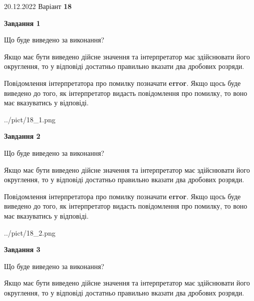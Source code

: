 \documentclass[12pt, ukrainian]{article}
\begin{document}
{20.12.2022 Варіант \No \textbf { 18 }\par}
{
\begin {Large}

{\begin {center}\textbf{Завдання 1}\end {center}}\par
Що буде виведено за виконання? \par

Якщо має бути виведено дійсне значення та інтерпретатор має здійснювати його округлення, 
то у відповіді достатньо правильно вказати два дробових розряди.

Повідомлення інтерпретатора про помилку позначати \textbf{error}.
Якщо щось буде виведено до того, як інтерпретатор видасть повідомлення про помилку, 
то воно має вказуватись у відповіді. \par

\begin{center}
	{../pict/18_1.png}
\end{center}
\newpage

{\begin {center}\textbf{Завдання 2}\end {center}}\par
Що буде виведено за виконання? \par

Якщо має бути виведено дійсне значення та інтерпретатор має здійснювати його округлення, 
то у відповіді достатньо правильно вказати два дробових розряди.

Повідомлення інтерпретатора про помилку позначати \textbf{error}.
Якщо щось буде виведено до того, як інтерпретатор видасть повідомлення про помилку, 
то воно має вказуватись у відповіді. \par

\begin{center}
	{../pict/18_2.png}
\end{center}
\newpage

{\begin {center}\textbf{Завдання 3}\end {center}}\par
Що буде виведено за виконання? \par

Якщо має бути виведено дійсне значення та інтерпретатор має здійснювати його округлення, 
то у відповіді достатньо правильно вказати два дробових розряди.


\end{Large}}
\end{document}
